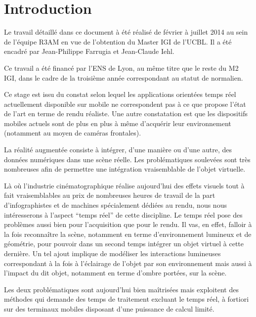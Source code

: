 \documentclass[10pt,a4paper,twoside, twocolumn]{report}
\begin{document}
\chapter{Introduction}

Le travail détaillé dans ce document à été réalisé de février à juillet 2014 au sein de l'équipe R3AM en vue de l’obtention du Master IGI de l'UCBL. Il a été encadré par Jean-Philippe Farrugia et Jean-Claude Iehl.

Ce travail a été financé par l'ENS de Lyon, au même titre que le reste du M2 IGI, dans le cadre de la troisième année correspondant au statut de normalien.

Ce stage est issu du constat selon lequel les applications orientées temps réel actuellement disponible sur mobile ne correspondent pas à ce que propose l'état de l'art en terme de rendu réaliste. Une autre constatation est que les dispositifs mobiles actuels sont de plus en plus à même d’acquérir leur environnement (notamment au moyen de caméras frontales). 

La réalité augmentée consiste à intégrer, d'une manière ou d'une autre, des données numériques dans une scène réelle. Les problématiques soulevées sont très nombreuses afin de permettre une intégration vraisemblable de l'objet virtuelle.

Là où l'industrie cinématographique réalise aujourd'hui des effets visuels tout à fait vraisemblables au prix de nombreuses heures de travail de la part d'infographistes et de machines spécialement dédiées au rendu, nous nous intéresserons à l'aspect “temps réel” de cette discipline. Le temps réel pose des problèmes aussi bien pour l'acquisition que pour le rendu. Il vas, en effet, falloir à la fois reconnaître la scène, notamment en terme d'environnement lumineux et de géométrie, pour pouvoir dans un second temps intégrer un objet virtuel à cette dernière. Un tel ajout implique de modéliser les interactions lumineuses correspondant à la fois à l'éclairage de l'objet par son environnement mais aussi à l'impact du dit objet, notamment en terme d'ombre portées, sur la scène.

Les deux problématiques sont aujourd'hui bien maîtrisées mais exploitent des méthodes qui demande des temps de traitement excluant le temps réel, à fortiori sur des terminaux mobiles disposant d'une puissance de calcul limité.
\end{document}
